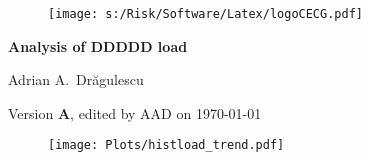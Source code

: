 \documentclass[letterpaper,12pt]{article}
\newcommand{\dealname}{DDDDD }
\begin{document}
\begin{figure}
\texttt{[image: s:/Risk/Software/Latex/logoCECG.pdf]}
\hfill
{}
\end{figure}

\vspace*{0.5in}
\begin{center}
\LARGE\bf{Analysis of \dealname load}
\end{center}
\begin{center}
   Adrian A.\ Dr\u{a}gulescu
\end{center}
\begin{center}
  \small{Version {\bf A}, edited by AAD on \today}
\end{center}
\vspace*{1in}


\newpage


\begin{center}
\begin{figure}
  \texttt{[image: Plots/histload\_trend.pdf]}
\end{figure}

\end{center}
\end{document}
